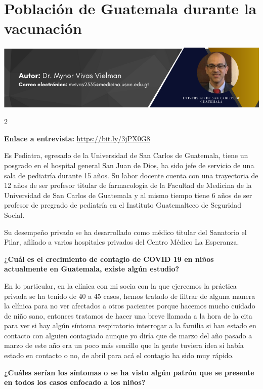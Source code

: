 \documentclass[12pt,spanish,Letterpaper,openany]{book}
\begin{document}
\hypertarget{vivas}{%
\chapter{Población de Guatemala durante la vacunación}\label{vivas}}

\begin{center}\includegraphics[width=1\linewidth]{images/Vivas} \end{center}

\begin {multicols}{2}

\textbf{Enlace a entrevista:} \url{https://bit.ly/3jPX0G8}

Es Pediatra, egresado de la Universidad de San Carlos de Guatemala, tiene un posgrado en
el hospital general San Juan de Dios, ha sido jefe de servicio de una sala de pediatría durante
15 años. Su labor docente cuenta con una trayectoria de 12 años de ser profesor titular de
farmacología de la Facultad de Medicina de la Universidad de San Carlos de Guatemala y al
mismo tiempo tiene 6 años de ser profesor de pregrado de pediatría en el Instituto
Guatemalteco de Seguridad Social.

Su desempeño privado se ha desarrollado como médico titular del Sanatorio el Pilar, afiliado
a varios hospitales privados del Centro Médico La Esperanza.

\textbf{¿Cuál es el crecimiento de contagio de COVID 19 en niños actualmente en Guatemala, existe algún estudio?}

En lo particular, en la clínica con mi socia con la que ejercemos la práctica privada se ha
tenido de 40 a 45 casos, hemos tratado de filtrar de alguna manera la clínica para no ver
afectados a otros pacientes porque hacemos mucho cuidado de niño sano, entonces tratamos
de hacer una breve llamada a la hora de la cita para ver si hay algún síntoma respiratorio
interrogar a la familia si han estado en contacto con alguien contagiado aunque yo diría que
de marzo del año pasado a marzo de este año era un poco más sencillo que la gente tuviera
idea si había estado en contacto o no, de abril para acá el contagio ha sido muy rápido.

\textbf{¿Cuáles serían los síntomas o se ha visto algún patrón que se presente en todos los casos enfocado a los niños?}


\end{multicols}
\end{document}

